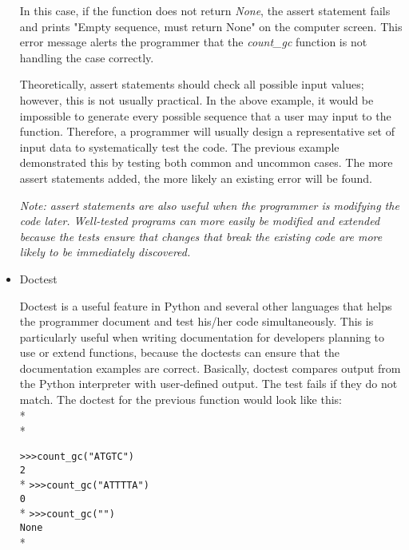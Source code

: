 \documentclass[ChapterTOCs,krantz2]{krantz} %
\begin{document}
\begin{itemize}
In this case, if the function does not return \emph{None}, the assert statement
fails and prints "Empty sequence, must return None" on the computer
screen.
This error message alerts the programmer that the \emph{count\_gc} function
is not handling the case correctly.  

Theoretically, assert statements should check all possible input
values; however, this is not usually practical. In the above example, it
would be impossible to generate every possible sequence that a user may
input to the function.  Therefore, a programmer will usually design
a representative set of input data to systematically test the code.  The
previous example demonstrated this by testing 
both common and uncommon cases.  The more assert statements
added, the more likely an existing error will be found.  

\textsl{Note: assert
statements are also useful 
when the programmer is modifying the code later.
Well-tested programs can more easily be modified and extended because the
tests ensure that changes that break the existing code are more likely to
be immediately discovered.}

\item Doctest

Doctest is a useful feature in Python and several other languages that helps the 
programmer document
and test his/her code simultaneously. This is particularly useful when writing
documentation for developers planning to use or extend functions, because
the doctests can ensure that the documentation examples are correct.
 Basically, doctest compares output
from the Python interpreter with user-defined output. The test fails if they do
not match. The doctest for the previous function would look like this:\\*\\*

\texttt{>>>count\_gc("ATGTC") \\2}\\*
\texttt{>>>count\_gc("ATTTTA") \\0}\\*
\texttt{>>>count\_gc("")\\None}\\*

\end{itemize}

\end{document}
